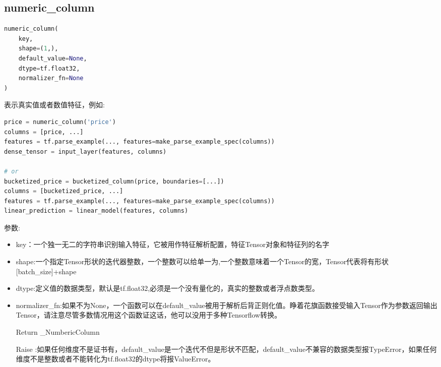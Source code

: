 \subsection{numeric\_column}
\begin{lstlisting}[language=Python]
numeric_column(
    key,
    shape=(1,),
    default_value=None,
    dtype=tf.float32,
    normalizer_fn=None
)
\end{lstlisting}
表示真实值或者数值特征，例如:
\begin{lstlisting}[language=Python]
price = numeric_column('price')
columns = [price, ...]
features = tf.parse_example(..., features=make_parse_example_spec(columns))
dense_tensor = input_layer(features, columns)

# or
bucketized_price = bucketized_column(price, boundaries=[...])
columns = [bucketized_price, ...]
features = tf.parse_example(..., features=make_parse_example_spec(columns))
linear_prediction = linear_model(features, columns)
\end{lstlisting}
参数:
\begin{itemize}
	\item key：一个独一无二的字符串识别输入特征，它被用作特征解析配置，特征Tensor对象和特征列的名字
	\item shape:一个指定Tensor形状的迭代器整数，一个整数可以给单一为,一个整数意味着一个Tensor的宽，Tensor代表将有形状[batch\_size]+shape
	\item dtype:定义值的数据类型，默认是tf.float32,必须是一个没有量化的，真实的整数或者浮点数类型。
	\item normalizer\_fn:如果不为None，一个函数可以在default\_value被用于解析后背正则化值。睁着花旗函数接受输入Tensor作为参数返回输出Tensor，请注意尽管多数情况用这个函数证这话，他可以没用于多种Tensorflow转换。
	\item[Return] \_NumbericColumn
	\item[Raise]:如果任何维度不是证书有，default\_value是一个迭代不但是形状不匹配，default\_value不兼容的数据类型报TypeError，如果任何维度不是整数或者不能转化为tf.float32的dtype将报ValueError。
\end{itemize}
